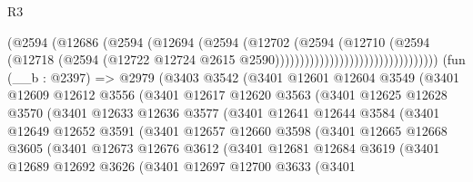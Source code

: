 \begin{lexlean}{R3}
\begin{coremodule}
                                              (@2594
                                                (@12686
                                                  (@2594
                                                    (@12694
                                                      (@2594
                                                        (@12702
                                                          (@2594
                                                            (@12710
                                                              (@2594
                                                                (@12718
                                                                  (@2594
                                                                    (@12722
                                                                      @12724
                                                                      @2615
                                                                      @2590)))))))))))))))))))))))))))))))))
    (fun (__b : @2397) =>
    @2979
      (@3403
        @3542
        (@3401
          @12601
          @12604
          @3549
          (@3401
            @12609
            @12612
            @3556
            (@3401
              @12617
              @12620
              @3563
              (@3401
                @12625
                @12628
                @3570
                (@3401
                  @12633
                  @12636
                  @3577
                  (@3401
                    @12641
                    @12644
                    @3584
                    (@3401
                      @12649
                      @12652
                      @3591
                      (@3401
                        @12657
                        @12660
                        @3598
                        (@3401
                          @12665
                          @12668
                          @3605
                          (@3401
                            @12673
                            @12676
                            @3612
                            (@3401
                              @12681
                              @12684
                              @3619
                              (@3401
                                @12689
                                @12692
                                @3626
                                (@3401
                                  @12697
                                  @12700
                                  @3633
                                  (@3401

\end{coremodule}
\end{lexlean}
